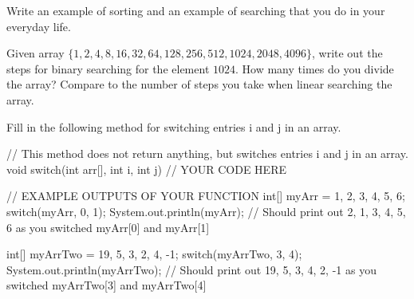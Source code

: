 \begin{exercise}
Write an example of sorting and an example of searching that you do in your everyday life.
\end{exercise}

\begin{exercise}

Given array $\{1, 2, 4, 8, 16, 32, 64, 128, 256, 512, 1024, 2048, 4096\}$, write out the steps for binary searching for the element $1024$. How many times do you divide the array? Compare to the number of steps you take when linear searching the array.

\end{exercise}

\begin{exercise}
 Fill in the following method for switching entries i and j in an array.
 
 \begin{code}
 // This method does not return anything, but switches entries i and j in an array.
 void switch(int arr[], int i, int j) 
{
    // YOUR CODE HERE
}

// EXAMPLE OUTPUTS OF YOUR FUNCTION
int[] myArr = {1, 2, 3, 4, 5, 6};
switch(myArr, 0, 1);
System.out.println(myArr); // Should print out {2, 1, 3, 4, 5, 6} as you switched myArr[0] and myArr[1]

int[] myArrTwo = {19, 5, 3, 2, 4, -1};
switch(myArrTwo, 3, 4);
System.out.println(myArrTwo); // Should print out {19, 5, 3, 4, 2, -1} as you switched myArrTwo[3] and myArrTwo[4]
 \end{code}
 
\end{exercise}

 
 
 
 
 
 
 
 
 
 
 
 
 
 


